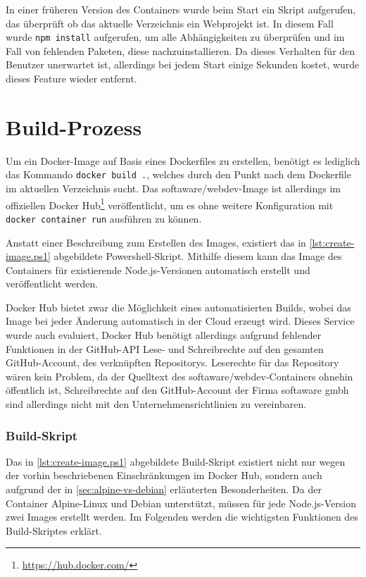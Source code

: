 In einer früheren Version des Containers wurde beim Start ein Skript aufgerufen, das überprüft ob das aktuelle Verzeichnis ein Webprojekt ist.
In diesem Fall wurde \verb|npm install| aufgerufen, um alle Abhängigkeiten zu überprüfen und im Fall von fehlenden Paketen, diese nachzuinstallieren.
Da dieses Verhalten für den Benutzer unerwartet ist, allerdings bei jedem Start einige Sekunden kostet, wurde dieses Feature wieder entfernt. 


\section{Build-Prozess}
\label{sec:build-process}
Um ein Docker-Image auf Basis eines Dockerfiles zu erstellen, benötigt es lediglich das Kommando \verb|docker build .|, welches durch den Punkt nach dem Dockerfile im aktuellen Verzeichnis sucht.
Das softaware/webdev-Image ist allerdings im offiziellen Docker Hub\footnote{\url{https://hub.docker.com/}} veröffentlicht, um es ohne weitere Konfiguration mit \verb|docker container run| ausführen zu können.

Anstatt einer Beschreibung zum Erstellen des Images, existiert das in \cref{lst:create-image.ps1} abgebildete Powershell-Skript.
Mithilfe diesem kann das Image des Containers für existierende Node.js-Versionen automatisch erstellt und veröffentlicht werden.

Docker Hub bietet zwar die Möglichkeit eines automatisierten Builds, wobei das Image bei jeder Änderung automatisch in der Cloud erzeugt wird.
Dieses Service wurde auch evaluiert, Docker Hub benötigt allerdings aufgrund fehlender Funktionen in der GitHub-API Lese- und Schreibrechte auf den gesamten GitHub-Account, des verknüpften Repositorys.
Leserechte für das Repository wären kein Problem, da der Quelltext des softaware/webdev-Containers ohnehin öffentlich ist, Schreibrechte auf den GitHub-Account der Firma softaware gmbh sind allerdings nicht mit den Unternehmensrichtlinien zu vereinbaren.

\subsubsection{Build-Skript}

Das in \cref{lst:create-image.ps1} abgebildete Build-Skript existiert nicht nur wegen der vorhin beschriebenen Einschränkungen im Docker Hub, sondern auch aufgrund der in \cref{sec:alpine-vs-debian} erläuterten Besonderheiten.
Da der Container Alpine-Linux und Debian unterstützt, müssen für jede Node.js-Version zwei Images erstellt werden.
Im Folgenden werden die wichtigsten Funktionen des Build-Skriptes erklärt.


